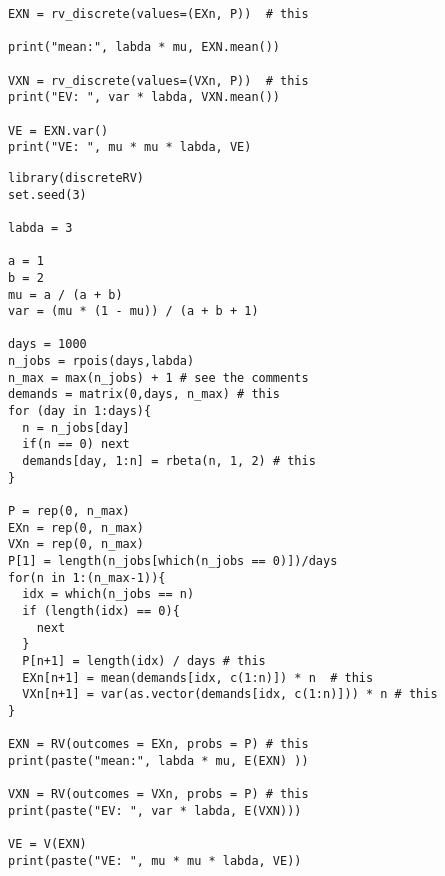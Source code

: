 \begin{exercise}
\begin{verbatim}
EXN = rv_discrete(values=(EXn, P))  # this

print("mean:", labda * mu, EXN.mean())

VXN = rv_discrete(values=(VXn, P))  # this
print("EV: ", var * labda, VXN.mean())

VE = EXN.var()
print("VE: ", mu * mu * labda, VE)
\end{verbatim}


\begin{verbatim}
library(discreteRV)
set.seed(3)

labda = 3

a = 1
b = 2
mu = a / (a + b)
var = (mu * (1 - mu)) / (a + b + 1)

days = 1000
n_jobs = rpois(days,labda)
n_max = max(n_jobs) + 1 # see the comments
demands = matrix(0,days, n_max) # this
for (day in 1:days){
  n = n_jobs[day]
  if(n == 0) next
  demands[day, 1:n] = rbeta(n, 1, 2) # this
}

P = rep(0, n_max)
EXn = rep(0, n_max)
VXn = rep(0, n_max)
P[1] = length(n_jobs[which(n_jobs == 0)])/days
for(n in 1:(n_max-1)){
  idx = which(n_jobs == n)
  if (length(idx) == 0){
    next
  }
  P[n+1] = length(idx) / days # this
  EXn[n+1] = mean(demands[idx, c(1:n)]) * n  # this
  VXn[n+1] = var(as.vector(demands[idx, c(1:n)])) * n # this
}

EXN = RV(outcomes = EXn, probs = P) # this
print(paste("mean:", labda * mu, E(EXN) ))

VXN = RV(outcomes = VXn, probs = P) # this
print(paste("EV: ", var * labda, E(VXN)))

VE = V(EXN)
print(paste("VE: ", mu * mu * labda, VE))
\end{verbatim}

\end{exercise}


